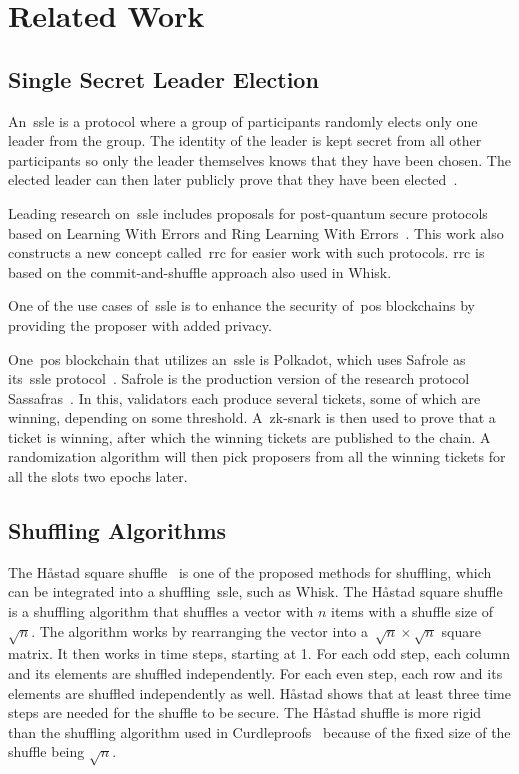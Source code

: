 \section{Related Work}\label{sec:related-work}




\subsection{Single Secret Leader Election}\label{sec:related-work-SSLE}
An~\gls{ssle} is a protocol where a group of participants randomly elects only one leader from the group.
The identity of the leader is kept secret from all other participants so only the leader themselves knows that they have been chosen.
The elected leader can then later publicly prove that they have been elected~\cite{10.1145/3419614.3423258}.

Leading research on~\gls{ssle} includes proposals for post-quantum secure protocols based on Learning With Errors and Ring Learning With Errors~\cite{cryptoeprint:2023/1241}.
This work also constructs a new concept called~\gls{rrc} for easier work with such protocols.
\gls{rrc} is based on the commit-and-shuffle approach also used in Whisk.

One of the use cases of~\gls{ssle} is to enhance the security of~\gls{pos} blockchains by providing the proposer with added privacy.

One~\gls{pos} blockchain that utilizes an~\gls{ssle} is Polkadot, which uses Safrole as its~\gls{ssle} protocol~\cite{safrole}.
Safrole is the production version of the research protocol Sassafras~\cite{sassafras}.
In this, validators each produce several tickets, some of which are winning, depending on some threshold.
A~\gls{zk-snark} is then used to prove that a ticket is winning, after which the winning tickets are published to the chain.
A randomization algorithm will then pick proposers from all the winning tickets for all the slots two epochs later.



\subsection{Shuffling Algorithms}\label{subsec:related-work-shuffling-algorithm}

The Håstad square shuffle~\cite{haastad2006square} is one of the proposed methods for shuffling, which can be integrated into a shuffling~\gls{ssle}, such as Whisk.
The Håstad square shuffle is a shuffling algorithm that shuffles a vector with $n$ items with a shuffle size of $\sqrt {n}$.
The algorithm works by rearranging the vector into a~$\sqrt{n}\times\sqrt{n}$ square matrix.
It then works in time steps, starting at 1.
For each odd step, each column and its elements are shuffled independently.
For each even step, each row and its elements are shuffled independently as well.
Håstad shows that at least three time steps are needed for the shuffle to be secure.
The Håstad shuffle is more rigid than the shuffling algorithm used in Curdleproofs~\cite{cryptoeprint:2022/560} because of the fixed size of the shuffle being $\sqrt{n}$.

